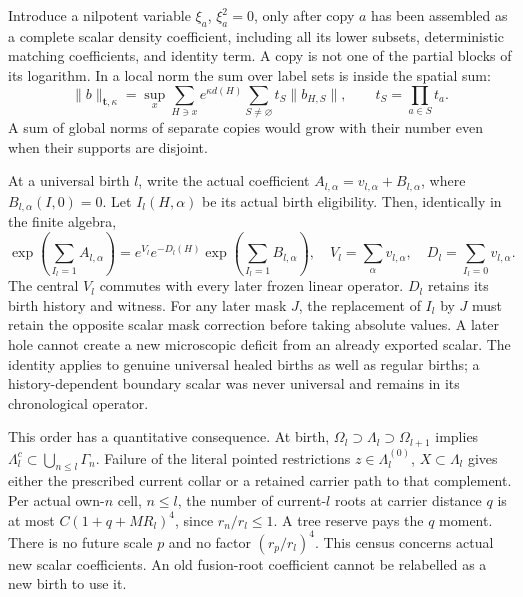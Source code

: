 Introduce a nilpotent variable $\xi_a$, $\xi_a^2=0$, only after copy $a$
has been assembled as a complete scalar density coefficient, including
all its lower subsets, deterministic matching coefficients, and identity
term.  A copy is not one of the partial blocks of its logarithm.
In a local norm the sum over label sets is inside the spatial sum:
\begin{equation}
 \|b\|_{\mathbf t,\kappa}=
 \sup_x\sum_{H\ni x}e^{\kappa d(H)}
                \sum_{S\ne\varnothing}t_S\|b_{H,S}\|,
 \qquad t_S=\prod_{a\in S}t_a.
 \label{ha:local-algebra}
\end{equation}
A sum of global norms of separate copies would grow with their number
even when their supports are disjoint.

At a universal birth $l$, write the actual coefficient
$A_{l,\alpha}=v_{l,\alpha}+B_{l,\alpha}$, where
$B_{l,\alpha}(I,0)=0$.  Let $I_l(H,\alpha)$ be its actual birth eligibility.
Then, identically in the finite algebra,
\begin{equation}
 \exp\!\left(\sum_{I_l=1}A_{l,\alpha}\right)
 =e^{V_l}e^{-D_l(H)}
       \exp\!\left(\sum_{I_l=1}B_{l,\alpha}\right),
 \quad
 V_l=\sum_\alpha v_{l,\alpha},\quad
 D_l=\sum_{I_l=0}v_{l,\alpha}.
 \label{ha:birth-scalar}
\end{equation}
The central $V_l$ commutes with every later frozen linear operator.
$D_l$ retains its birth history and witness.  For any later mask $J$,
the replacement of $I_l$ by $J$ must retain the opposite scalar mask
correction before taking absolute values.  A later hole cannot create
a new microscopic deficit from an already exported scalar.  The
identity applies to genuine universal healed births as well as regular
births; a history-dependent boundary scalar was never universal and
remains in its chronological operator.

This order has a quantitative consequence.  At birth,
$\Omega_l\supset\Lambda_l\supset\Omega_{l+1}$ implies
$\Lambda_l^c\subset\bigcup_{n\leq l}\Gamma_n$.  Failure of the literal
pointed restrictions $z\in\Lambda_l^{(0)}$, $X\subset\Lambda_l$ gives
either the prescribed current collar or a retained carrier path to that
complement.  Per actual own-$n$ cell, $n\leq l$, the number of current-$l$
roots at carrier distance $q$ is at most
$C(1+q+MR_l)^4$, since $r_n/r_l\leq1$.  A tree reserve pays the $q$
moment.  There is no future scale $p$ and no factor $(r_p/r_l)^4$.
This census concerns actual new scalar coefficients.  An old fusion-root
coefficient cannot be relabelled as a new birth to use it.

